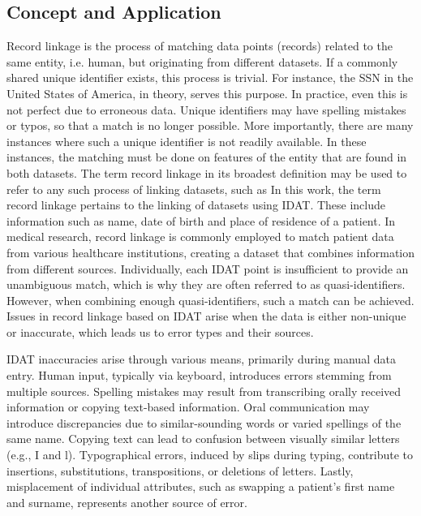 \subsection{Concept and Application}
Record linkage is the process of matching data points (records) related to the same entity, i.e. human, but originating from different datasets.
If a commonly shared unique identifier exists, this process is trivial. %
For instance, the \ac{SSN} in the United States of America, in theory, serves this purpose.
In practice, even this is not perfect due to erroneous data.
Unique identifiers may have spelling mistakes or typos, so that a match is no longer possible.
More importantly, there are many instances where such a unique identifier is not readily available.
In these instances, the matching must be done on features of the entity that are found in both datasets. %
The term record linkage in its broadest definition may be used to refer to any such process of linking datasets, such as %
In this work, the term record linkage pertains to the linking of datasets using \ac{IDAT}.
These include information such as name, date of birth and place of residence of a patient.
In medical research, record linkage is commonly employed to match patient data from various healthcare institutions, creating a dataset that combines information from different sources.
Individually, each \ac{IDAT} point is insufficient to provide an unambiguous match, which is why they are often referred to as quasi-identifiers. %
However, when combining enough quasi-identifiers, such a match can be achieved.
Issues in record linkage based on \ac{IDAT} arise when the data is either non-unique or inaccurate, which leads us to error types and their sources.

\Ac{IDAT} inaccuracies arise through various means, primarily during manual data entry.
Human input, typically via keyboard, introduces errors stemming from multiple sources.
Spelling mistakes may result from transcribing orally received information or copying text-based information.
Oral communication may introduce discrepancies due to similar-sounding words or varied spellings of the same name.
Copying text can lead to confusion between visually similar letters (e.g., I and l).
Typographical errors, induced by slips during typing, contribute to insertions, substitutions, transpositions, or deletions of letters.
Lastly, misplacement of individual attributes, such as swapping a patient's first name and surname, represents another source of error.

